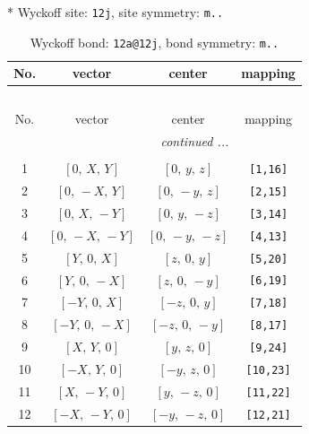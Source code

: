 \documentclass[fleqn,8pt]{jsarticle}
\begin{document}
* Wyckoff site: {\tt 12j}, site symmetry: {\tt m..}
\renewcommand{\arraystretch}{1.2}
\begin{longtable}{cccc}
\caption{Wyckoff bond: {\tt 12a@12j}, bond symmetry: {\tt m..}}
 \\
 \hline \hline
No. & vector & center & mapping \\ \hline \endfirsthead

\multicolumn{3}{l}{\tablename\ \thetable{}} \\
 \hline \hline
No. & vector & center & mapping \\ \hline \endhead

 \hline \hline
\multicolumn{3}{r}{\footnotesize\it continued ...} \\ \endfoot

 \hline \hline
\multicolumn{3}{r}{} \\ \endlastfoot

1 & $\left[ 0,\, X,\, Y \right]$ & $\left[ 0,\, y,\, z \right]$ & {\tt [1,16]} \\ \hline
2 & $\left[ 0,\, - X,\, Y \right]$ & $\left[ 0,\, - y,\, z \right]$ & {\tt [2,15]} \\ \hline
3 & $\left[ 0,\, X,\, - Y \right]$ & $\left[ 0,\, y,\, - z \right]$ & {\tt [3,14]} \\ \hline
4 & $\left[ 0,\, - X,\, - Y \right]$ & $\left[ 0,\, - y,\, - z \right]$ & {\tt [4,13]} \\ \hline
5 & $\left[ Y,\, 0,\, X \right]$ & $\left[ z,\, 0,\, y \right]$ & {\tt [5,20]} \\ \hline
6 & $\left[ Y,\, 0,\, - X \right]$ & $\left[ z,\, 0,\, - y \right]$ & {\tt [6,19]} \\ \hline
7 & $\left[ - Y,\, 0,\, X \right]$ & $\left[ - z,\, 0,\, y \right]$ & {\tt [7,18]} \\ \hline
8 & $\left[ - Y,\, 0,\, - X \right]$ & $\left[ - z,\, 0,\, - y \right]$ & {\tt [8,17]} \\ \hline
9 & $\left[ X,\, Y,\, 0 \right]$ & $\left[ y,\, z,\, 0 \right]$ & {\tt [9,24]} \\ \hline
10 & $\left[ - X,\, Y,\, 0 \right]$ & $\left[ - y,\, z,\, 0 \right]$ & {\tt [10,23]} \\ \hline
11 & $\left[ X,\, - Y,\, 0 \right]$ & $\left[ y,\, - z,\, 0 \right]$ & {\tt [11,22]} \\ \hline
12 & $\left[ - X,\, - Y,\, 0 \right]$ & $\left[ - y,\, - z,\, 0 \right]$ & {\tt [12,21]} \\
\end{longtable}
\renewcommand{\arraystretch}{1.2}
\end{document}
